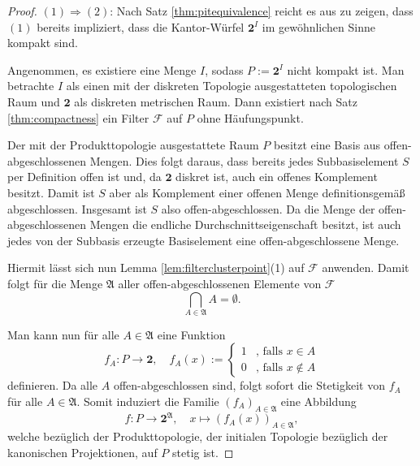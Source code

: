 \begin{proof}
  $(1)\Rightarrow(2) $: Nach Satz \ref{thm:pitequivalence} reicht es aus zu zeigen, dass $(1)$ bereits impliziert, dass die Kantor-Würfel $\mathbf{2}^I$ im gewöhnlichen Sinne kompakt sind.

  Angenommen, es existiere eine Menge $I$, sodass $P:= \mathbf{2}^I$ nicht kompakt ist.
  Man betrachte $I$ als einen mit der diskreten Topologie ausgestatteten topologischen Raum und $\mathbf{2}$ als diskreten metrischen Raum.
  Dann existiert nach Satz \ref{thm:compactness} ein Filter $\mathcal{F}$ auf $P$ ohne Häufungspunkt.

  Der mit der Produkttopologie ausgestattete Raum $P$ besitzt eine Basis aus offen-ab\-ge\-schlossenen Mengen.
  Dies folgt daraus, dass bereits jedes Subbasiselement $S$ per Definition offen ist und, da $\mathbf{2}$ diskret ist, auch ein offenes Komplement besitzt.
  Damit ist $S$ aber als Komplement einer offenen Menge definitionsgemäß abgeschlossen.
  Insgesamt ist $S$ also offen-abgeschlossen.
  Da die Menge der offen-abgeschlossenen Mengen die endliche Durchschnittseigenschaft besitzt, ist auch jedes von der Subbasis erzeugte Basiselement eine offen-abgeschlossene Menge.

  Hiermit lässt sich nun Lemma \ref{lem:filterclusterpoint}(1) auf $\mathcal{F}$ anwenden.
  Damit folgt für die Menge $\mathfrak{A}$ aller offen-abgeschlossenen Elemente von $\mathcal{F}$
  \begin{displaymath}
    \bigcap_{A \in \mathfrak{A}} A = \emptyset \tag{$\ast$}.
  \end{displaymath}

  Man kann nun für alle $A \in \mathfrak{A}$ eine Funktion
  \begin{equation}
    \label{eq:clopenmap}
    f_A \colon P \to \mathbf{2}, \quad
    f_A(x) := 
    \begin{cases}
      1 &\text{, falls } x \in A \\
      0 &\text{, falls } x \not\in A
    \end{cases}
  \end{equation}
  definieren.
  Da alle $A$ offen-abgeschlossen sind, folgt sofort die Stetigkeit von $f_A$ für alle $A \in \mathfrak{A}$.
  Somit induziert die Familie $(f_A)_{A \in \mathfrak{A}}$ eine Abbildung 
  \begin{displaymath}
    f \colon P \to \mathbf{2}^\mathfrak{A}, \quad
    x \mapsto (f_A(x))_{A \in \mathfrak{A}},
  \end{displaymath}
  welche bezüglich der Produkttopologie, der initialen Topologie bezüglich der kanonischen Projektionen, auf $P$ stetig ist.


\end{proof}
